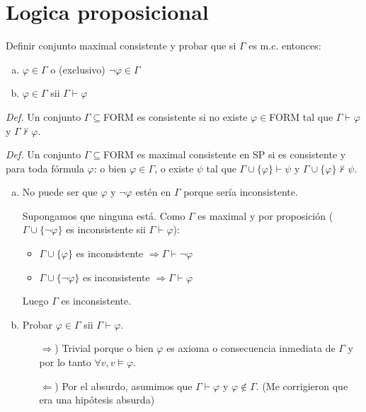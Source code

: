 \section{Logica proposicional}

\begin{questions}

\question Definir conjunto maximal consistente y probar que si $\Gamma$ es m.c. entonces: 

\begin{enumerate}[a)]
 \item $\varphi\in\Gamma$ o (exclusivo) $\neg\varphi\in\Gamma$
 \item $\varphi\in\Gamma$ sii $\Gamma\vdash\varphi$
\end{enumerate}


\begin{solution}

 {\it Def. } Un conjunto $\Gamma\subseteq$FORM es consistente si no existe $\varphi\in$FORM tal que $\Gamma\vdash\varphi$ y $\Gamma\nvdash\varphi$.
 
 {\it Def. } Un conjunto $\Gamma\subseteq$FORM es maximal consistente en SP si es consistente y para toda f\'ormula $\varphi$: o bien $\varphi\in\Gamma$, o existe $\psi$ tal que $\Gamma\cup\{\varphi\}\vdash\psi$ y $\Gamma\cup\{\varphi\}\nvdash\psi$.

 \begin{enumerate}[a)]
  \item No puede ser que $\varphi$ y $\neg\varphi$ est\'en en $\Gamma$ porque  ser\'ia inconsistente.
  
  Supongamos que ninguna est\'a. Como $\Gamma$ es maximal y por proposici\'on ($\Gamma\cup\{\neg\varphi\}$ es inconsistente sii $\Gamma\vdash\varphi$): 
  
  \begin{itemize}
   \item $\Gamma\cup\{\varphi\}$ es inconsistente $\Rightarrow \Gamma\vdash\neg\varphi$
   \item $\Gamma\cup\{\neg\varphi\}$ es inconsistente $\Rightarrow \Gamma\vdash\varphi$
  \end{itemize}

  Luego $\Gamma$ es inconsistente.
  
  \item Probar $\varphi\in\Gamma$ sii $\Gamma\vdash\varphi$. 
  
  \begin{itemize}
   \item[$\Rightarrow$)] Trivial porque o bien $\varphi$ es axioma o consecuencia inmediata de $\Gamma$ y por lo tanto $\forall v, v\vDash\varphi$. 
   \item[$\Leftarrow$)] Por el absurdo, asumimos que $\Gamma\vdash\varphi$ y $\varphi\notin\Gamma$. (Me corrigieron que era una hip\'otesis absurda)
  \end{itemize}


\end{enumerate}
\end{solution}
\end{questions}
